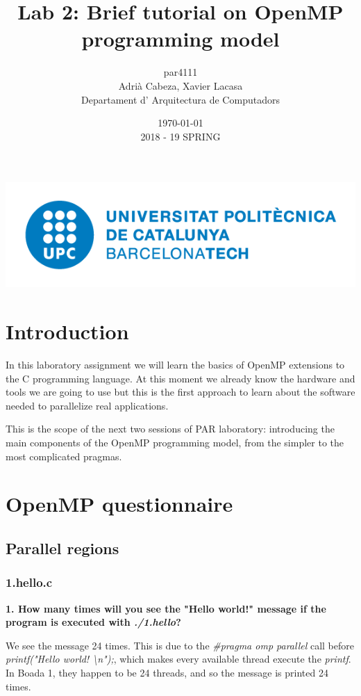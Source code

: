 \documentclass[12]{article}
\author{par4111 \\ Adrià Cabeza, Xavier Lacasa \\ Departament d' Arquitectura de Computadors}
\title{Lab 2: Brief tutorial on OpenMP programming model }
\date{\today \\ 2018 - 19 SPRING}
\begin{document}
\maketitle

\vspace*{\fill}
\begin{center}
\includegraphics[scale=0.5]{images/UPClogo.png}
\end{center}
\newpage
\tableofcontents
\newpage
\section{Introduction}

In this laboratory assignment we will learn the basics of OpenMP extensions to the C programming language. At this moment we already know the hardware and tools we are going to use but this is the first approach to learn about the software needed to parallelize real applications. 

This is the scope of the next two sessions of PAR laboratory: introducing the  main components of the OpenMP programming model, from the simpler to the most complicated pragmas. 

\section{OpenMP questionnaire}

\subsection{Parallel regions}
\subsubsection{1.hello.c}
\textbf{1. How many times will you see the "Hello world!" message if the program is executed with \textit{./1.hello}?}

We see the message 24 times. This is due to the \textit{\#pragma omp parallel} call before \textit{printf("Hello world! \textbackslash n");}, which makes every available thread execute the \textit{printf}. In Boada 1, they happen to be 24 threads, and so the message is printed 24 times.
\end{document}
